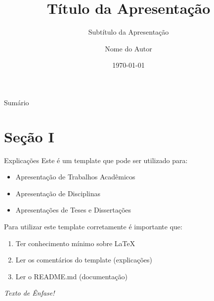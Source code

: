 \documentclass{libs/ufc_format}
\title[short title]{\textbf{Título da Apresentação}}
\subtitle{Subtítulo da Apresentação}
\author{Nome do Autor}
\institute[UFC]{
    \ufc
}
\date{\today}
\begin{document}

\begin{frame}{}
    \maketitle
\end{frame}

\begin{frame}{Sumário}
    \tableofcontents
\end{frame}

\section{Seção I}
\begin{frame}{Explicações}
    Este é um template que pode ser utilizado para:
    \begin{itemize}
        \item Apresentação de Trabalhos Acadêmicos
        \item Apresentação de Disciplinas
        \item Apresentações de Teses e Dissertações
    \end{itemize}

    \vspace{0.4cm} %
    
    Para utilizar este template corretamente é importante que:
    \begin{enumerate}
        \item Ter conhecimento mínimo sobre LaTeX
        \item Ler os comentários do template (explicações)
        \item Ler o README.md (documentação)
    \end{enumerate}

    \vspace{0.2cm}

     \emph{Texto de Ênfase!}
\end{frame}

\end{document}
